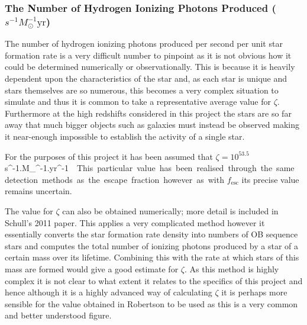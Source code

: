 		\subsubsection{The Number of Hydrogen Ionizing Photons Produced ($s^{-1}M_\odot^{-1}\text{yr}$)} %
		\label{sub:hydrogen_ionizing_photons_produced_per_second_per_unit_star_formation_rate}
			The number of hydrogen ionizing photons produced per second per unit star formation rate is a very difficult number to pinpoint as it is not obvious how it could be determined numerically or observationally. This is because it is heavily dependent upon the characteristics of the star and, as each star is unique and stars themselves are so numerous, this becomes a very complex situation to simulate and thus it is common to take a representative average value for $\zeta$. Furthermore at the high redshifts considered in this project the stars are so far away that much bigger objects such as galaxies must instead be observed making it near-enough impossible to establish the activity of a single star.

			For the purposes of this project it has been assumed that $\zeta=10^{53.5}$\si{s^{-1}.M_{\odot}^{-1}.yr^{-1}}\cite{robertson2010early}. This particular value has been realised through the same detection methods as the escape fraction however as with $f_\text{esc}$ its precise value remains uncertain.

			The value for $\zeta$ can also be obtained numerically; more detail is included in Schull's 2011 paper\cite{shull2012critical}. This applies a very complicated method however it essentially converts the star formation rate density into numbers of OB sequence stars and computes the total number of ionizing photons produced by a star of a certain mass over its lifetime. Combining this with the rate at which stars of this mass are formed would give a good estimate for $\zeta$. As this method is highly complex it is not clear to what extent it relates to the specifics of this project and hence although it is a highly advanced way of calculating $\zeta$ it is perhaps more sensible for the value obtained in Robertson to be used as this is a very common and better understood figure.

